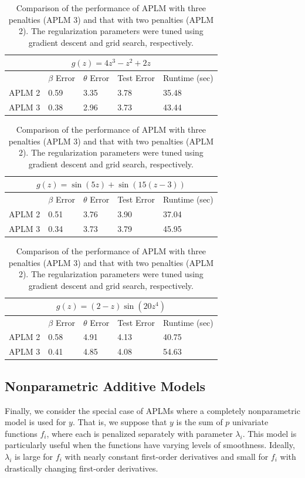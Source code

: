 \documentclass[12pt,letterpaper]{article}
\begin{document}
\begin{table}
\begin{center}
\begin{tabular}{| l | l | l | l | l | }
\hline
\multicolumn{5}{|c|}{$g(z) = 4z^3 - z^2 + 2z$}\\
\hline
 & $\beta$ Error & $\theta$ Error & Test Error & Runtime (sec) \\
\hline
APLM 2 & 0.59 & 3.35 & 3.78 & 35.48 \\
\hline
APLM 3 & 0.38 & 2.96 & 3.73 & 43.44 \\
\hline
\end{tabular}

\begin{tabular}{| l | l | l | l | l | }
\hline
\multicolumn{5}{|c|}{$g(z) = \sin(5z) + \sin(15(z - 3))$}\\
\hline
 & $\beta$ Error & $\theta$ Error & Test Error & Runtime (sec) \\
\hline
APLM 2 & 0.51 & 3.76 & 3.90 & 37.04 \\
\hline
APLM 3 & 0.34 & 3.73 & 3.79 & 45.95 \\
\hline
\end{tabular}

\begin{tabular}{| l | l | l | l | l | }
\hline
\multicolumn{5}{|c|}{$g(z) = (2-z)\sin(20z^4)$}\\
\hline
 & $\beta$ Error & $\theta$ Error & Test Error & Runtime (sec) \\
\hline
APLM 2 & 0.58 & 4.91 & 4.13 & 40.75 \\
\hline
APLM 3 & 0.41 & 4.85 & 4.08 & 54.63 \\
\hline
\end{tabular}
\end{center}
\caption {Comparison of the performance of APLM with three penalties (APLM 3) and that with two penalties (APLM 2). The regularization parameters were tuned using gradient descent and grid search, respectively.}
\label{ref:aplm}
\end{table}

\subsection{Nonparametric Additive Models}

Finally, we consider the special case of APLMs where a completely nonparametric model is used for $y$. That is, we suppose that $y$ is the sum of $p$ univariate functions $f_i$, where each is penalized separately with parameter $\lambda_i$. This model is particularly useful when the functions have varying levels of smoothness. Ideally, $\lambda_i$ is large for $f_i$ with nearly constant first-order derivatives and small for $f_i$ with drastically changing first-order derivatives. 
\end{document}
